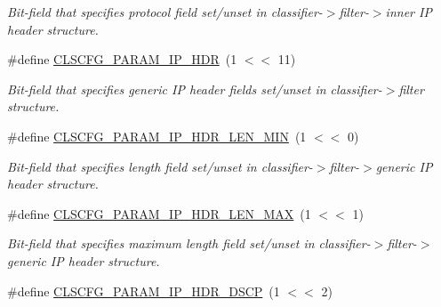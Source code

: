 \begin{DoxyCompactItemize}
\begin{DoxyCompactList}\small\item\em Bit-\/field that specifies protocol field set/unset in classifier-\/$>$filter-\/$>$inner I\-P header structure. \end{DoxyCompactList}\item 
\hypertarget{group__FAPI__QOS__CLASS_ga4bb55299d7f6d2c30e22ad0b60ed6414}{\#define \hyperlink{group__FAPI__QOS__CLASS_ga4bb55299d7f6d2c30e22ad0b60ed6414}{C\-L\-S\-C\-F\-G\-\_\-\-P\-A\-R\-A\-M\-\_\-\-I\-P\-\_\-\-H\-D\-R}~(1 $<$$<$ 11)}\label{group__FAPI__QOS__CLASS_ga4bb55299d7f6d2c30e22ad0b60ed6414}

\begin{DoxyCompactList}\small\item\em Bit-\/field that specifies generic I\-P header fields set/unset in classifier-\/$>$filter structure. \end{DoxyCompactList}\item 
\hypertarget{group__FAPI__QOS__CLASS_ga1eb07a962deae3b21034729a7849a214}{\#define \hyperlink{group__FAPI__QOS__CLASS_ga1eb07a962deae3b21034729a7849a214}{C\-L\-S\-C\-F\-G\-\_\-\-P\-A\-R\-A\-M\-\_\-\-I\-P\-\_\-\-H\-D\-R\-\_\-\-L\-E\-N\-\_\-\-M\-I\-N}~(1 $<$$<$ 0)}\label{group__FAPI__QOS__CLASS_ga1eb07a962deae3b21034729a7849a214}

\begin{DoxyCompactList}\small\item\em Bit-\/field that specifies length field set/unset in classifier-\/$>$filter-\/$>$generic I\-P header structure. \end{DoxyCompactList}\item 
\hypertarget{group__FAPI__QOS__CLASS_ga7d0581c861e827ee81124e0d0cb210c1}{\#define \hyperlink{group__FAPI__QOS__CLASS_ga7d0581c861e827ee81124e0d0cb210c1}{C\-L\-S\-C\-F\-G\-\_\-\-P\-A\-R\-A\-M\-\_\-\-I\-P\-\_\-\-H\-D\-R\-\_\-\-L\-E\-N\-\_\-\-M\-A\-X}~(1 $<$$<$ 1)}\label{group__FAPI__QOS__CLASS_ga7d0581c861e827ee81124e0d0cb210c1}

\begin{DoxyCompactList}\small\item\em Bit-\/field that specifies maximum length field set/unset in classifier-\/$>$filter-\/$>$generic I\-P header structure. \end{DoxyCompactList}\item 
\hypertarget{group__FAPI__QOS__CLASS_ga5af2e483d1bb74431d91f985d547e5ca}{\#define \hyperlink{group__FAPI__QOS__CLASS_ga5af2e483d1bb74431d91f985d547e5ca}{C\-L\-S\-C\-F\-G\-\_\-\-P\-A\-R\-A\-M\-\_\-\-I\-P\-\_\-\-H\-D\-R\-\_\-\-D\-S\-C\-P}~(1 $<$$<$ 2)}\label{group__FAPI__QOS__CLASS_ga5af2e483d1bb74431d91f985d547e5ca}


\end{DoxyCompactItemize}

